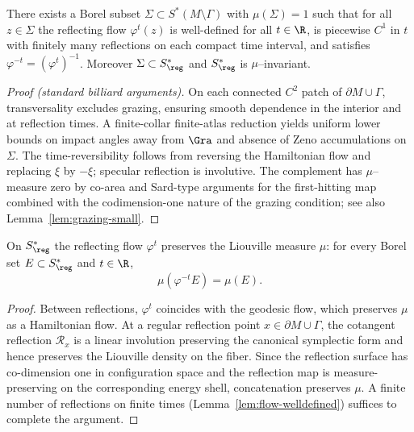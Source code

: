 \begin{lemma}
\label{lem:flow-welldefined}
There exists a Borel subset $\Sigma\subset S^*(M\setminus\Gamma)$ with $\mu(\Sigma)=1$ such that for all $z\in \Sigma$ the reflecting flow $\varphi^t(z)$ is well-defined for all $t\in\R$, is piecewise $C^1$ in $t$ with finitely many reflections on each compact time interval, and satisfies $\varphi^{-t}=(\varphi^t)^{-1}$. Moreover $\Sigma\subset S^*_{\reg}$ and $S^*_{\reg}$ is $\mu$–invariant.
\end{lemma}

\begin{proof}[Proof (standard billiard arguments)]
On each connected $C^2$ patch of $\partial M\cup\Gamma$, transversality excludes grazing, ensuring smooth dependence in the interior and at reflection times. A finite-collar finite-atlas reduction yields uniform lower bounds on impact angles away from $\Gra$ and absence of Zeno accumulations on $\Sigma$. The time-reversibility follows from reversing the Hamiltonian flow and replacing $\xi$ by $-\xi$; specular reflection is involutive. The complement has $\mu$–measure zero by co-area and Sard-type arguments for the first-hitting map combined with the codimension-one nature of the grazing condition; see also Lemma~\ref{lem:grazing-small}.
\end{proof}

\begin{lemma}
\label{lem:liouville-preserve-strong}
On $S^*_{\reg}$ the reflecting flow $\varphi^t$ preserves the Liouville measure $\mu$:
for every Borel set $E\subset S^*_{\reg}$ and $t\in\R$,
\[
\mu(\varphi^{-t}E)=\mu(E).
\]
\end{lemma}

\begin{proof}
Between reflections, $\varphi^t$ coincides with the geodesic flow, which preserves $\mu$ as a Hamiltonian flow. At a regular reflection point $x\in \partial M\cup\Gamma$, the cotangent reflection $\mathcal R_x$ is a linear involution preserving the canonical symplectic form and hence preserves the Liouville density on the fiber. Since the reflection surface has co-dimension one in configuration space and the reflection map is measure-preserving on the corresponding energy shell, concatenation preserves $\mu$. A finite number of reflections on finite times (Lemma~\ref{lem:flow-welldefined}) suffices to complete the argument.
\end{proof}

